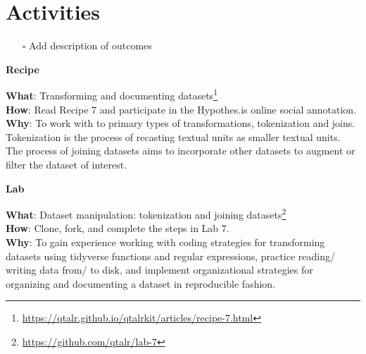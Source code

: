 \documentclass[
  letterpaper,
  DIV=11,
  numbers=noendperiod]{scrreport}
\providecommand{\tightlist}{%
  \setlength{\itemsep}{0pt}\setlength{\parskip}{0pt}}\usepackage{longtable,booktabs,array}
\theoremstyle{definition}
\theoremstyle{remark}
\DeclareRobustCommand{\href}[2]{#2\footnote{\url{#1}}}
\begin{document}
\hypertarget{activities-5}{%
\section*{Activities}\label{activities-5}}


\begin{itemize}
\tightlist
\item[$\square$]
   Add description of outcomes
\end{itemize}

\begin{tcolorbox}[enhanced jigsaw, leftrule=.75mm, bottomrule=.15mm, opacityback=0, breakable, left=2mm, colback=white, toprule=.15mm, arc=.35mm, rightrule=.15mm]

\textbf{ Recipe}

\textbf{What}:
\href{https://qtalr.github.io/qtalrkit/articles/recipe-7.html}{Transforming
and documenting datasets}\\
\textbf{How}: Read Recipe 7 and participate in the Hypothes.is online
social annotation.\\
\textbf{Why}: To work with to primary types of transformations,
tokenization and joins. Tokenization is the process of recasting textual
units as smaller textual units. The process of joining datasets aims to
incorporate other datasets to augment or filter the dataset of interest.

\end{tcolorbox}

\begin{tcolorbox}[enhanced jigsaw, leftrule=.75mm, bottomrule=.15mm, opacityback=0, breakable, left=2mm, colback=white, toprule=.15mm, arc=.35mm, rightrule=.15mm]

\textbf{ Lab}

\textbf{What}: \href{https://github.com/qtalr/lab-7}{Dataset
manipulation: tokenization and joining datasets}\\
\textbf{How}: Clone, fork, and complete the steps in Lab 7.\\
\textbf{Why}: To gain experience working with coding strategies for
transforming datasets using tidyverse functions and regular expressions,
practice reading/ writing data from/ to disk, and implement
organizational strategies for organizing and documenting a dataset in
reproducible fashion.

\end{tcolorbox}
\end{document}
